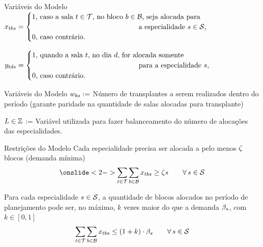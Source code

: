 \documentclass[handout]{beamer}
\begin{document}
\begin{frame}{Variáveis do Modelo}
    $\blockvar = \begin{cases}
        1\text{, caso a sala $\roomidx \in \roomset$, no bloco $\blockidx \in \blockset$, seja alocada para} \\
        \hspace{15em}\text{a especialidade $\specialtyidx \in \specialtyset$,} \\
        0\text{, caso contrário.}
    \end{cases}$
    \vspace{2em}

    $\precvar = \begin{cases}
        1\text{, quando a sala $\roomidx$, no dia $\planninghorizonidx$, for alocada somente} \\
        \hspace{15em}\text{para a especialidade $\specialtyidx$,} \\
        0\text{, caso contrário.}
    \end{cases}$
\end{frame}


\begin{frame}{Variáveis do Modelo}
    $w_{bs} := $ Número de transplantes a serem realizados dentro do período (garante paridade na quantidade de salas alocadas para transplante)
    \vspace{2em}

    $L \in \mathbb{Z}$ := Variável utilizada para fazer balanceamento do número de alocações das especialidades. 
\end{frame}


\begin{frame}{Restrições do Modelo}
    Cada especialidade precisa ser alocada a pelo menos $\zeta$ blocos (demanda mínima)
    \begin{equation}
    \onslide<2->\label{eq:m2-2}
        \sum_{\roomidx \in \roomset} \sum_{\blockidx \in \blockset} \blockvar \geq \mindeficit{\specialtyidx} \hspace{2em} \forall\, \specialtyidx \in \specialtyset
    \end{equation}
    \vspace{2em}

    Para cada especialidade $s \in \mathcal{S}$, a quantidade de blocos alocados no período de planejamento pode ser, no máximo, $k$ vezes maior do que a demanda $\beta_{s}$, com $k \in [0,1]$
    \begin{equation}
    \label{eq:m2-3}
        \sum_{t \in \mathcal{T}} \sum_{b \in \mathcal{B}} x_{tbs} \leq (1 + k) \cdot \beta_{s} \hspace{2em} \forall\, s \in \mathcal{S}
    \end{equation}
\end{frame}
\end{document}
